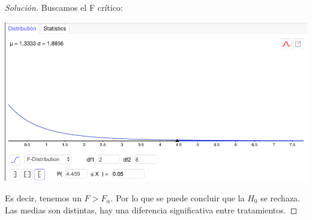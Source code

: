 \documentclass[a4paper,12pt]{article}
\newenvironment{solution}
  {\renewcommand\qedsymbol{$\blacksquare$}\begin{proof}[Solución]}
  {\end{proof}}
\begin{document}
\begin{solution}
Buscamos el F crítico: 
\begin{center}
    \includegraphics[scale=0.4]{Imagenes/13-3.png}
\end{center}
Es decir, tenemos un $F>F_{\alpha}$. Por lo que se puede concluir que la $H_0$ se rechaza. Las medias son distintas, hay una diferencia significativa entre tratamientos.
\end{solution}
\end{document}
